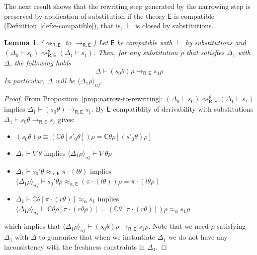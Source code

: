 \documentclass[submission,copyright,creativecommons]{eptcs}
\newcommand{\aleq}{\approx_{\alpha}}
\newcommand{\ealeq}{\approx_{\alpha,\theory{E}}}
\newcommand{\nfpair}[1]{\langle #1\rangle_{nf}}
\newcommand{\theory}[1]{\ensuremath{\mathsf{#1}}}
\newcommand{\context}[1]{\mathbb{C}}
\theoremstyle{plain}
\newtheorem{lemma}[theorem]{Lemma}
\theoremstyle{definition}
\theoremstyle{remark}
\begin{document}
The next result shows that the rewriting step generated by the narrowing step
is preserved by application of substitution if the theory \theory{E} is compatible (Definition~\ref{def:e-compatible}), that is, $\vdash$ is closed by substitutions.
\begin{lemma}{($\rightsquigarrow_{\theory{R,E}}$ to $\to_{\theory{R,E}}$)}
\label{lem:correctness}
Let \theory{E} be compatible with $\vdash$ by substitutions and  $(\Delta_0 \vdash s_0) \rightsquigarrow_{\theory{R,E}}^\theta (\Delta_1 \vdash s_1) $. Then, for any substitution $\rho$ that satisfies $\Delta_1$ with $\Delta$,
the following holds
$$\Delta \vdash (s_0 \theta )\rho \rightarrow_{\theory{R,E}}  s_1 \rho$$
In particular, $\Delta$ will be $\nfpair{\Delta_1\rho}$.
\end{lemma}
\begin{proof}
From Proposition~\ref{prop:narrow-to-rewriting}:
$(\Delta_0\vdash s_0) \rightsquigarrow_{\theory{R,E}}^{\theta} (\Delta_1 \vdash s_1) $ implies $\Delta_1\vdash (s_0 \theta ) \rightarrow_{\theory{R,E}}  s_1 $.
By \theory{E}-compatiblity of derivability with substitutions $\Delta_1 \vdash s_0\theta \rightarrow_{\theory{R,E}} s_1$ gives: 

\begin{itemize}
    \item $(s_0\theta)\rho \equiv (\context{C}\theta[s'_0\theta])\rho = \context{C}\theta\rho[(s'_0\theta)\rho]$
    \item $\Delta_1 \vdash \nabla\theta$ implies  $\nfpair{\Delta_1\rho} \vdash \nabla\theta\rho$
    \item $\Delta_1 \vdash s_0'\theta \ealeq \pi\cdot (l\theta)$ implies $\nfpair{\Delta_1\rho} \vdash s_0'\theta\rho \ealeq (\pi\cdot(l\theta))\rho = \pi\cdot(l\theta\rho)$
    \item $\Delta_1 \vdash \context{C}\theta[\pi\cdot(r\theta)] \aleq s_1$ implies $\nfpair{\Delta_1\rho} \vdash \context{C}\theta\rho[\pi\cdot(r\theta\rho)] = (\context{C}\theta[\pi\cdot(r\theta)])\rho \aleq s_1\rho$
\end{itemize}
which implies that $\nfpair{\Delta_1\rho} \vdash (s_0\theta)\rho \rightarrow_{\theory{R,E}} s_1\rho$.
Note that we need $\rho$ satisfying $\Delta_1$ with $\Delta$ to guarantee that when we instantiate $\Delta_1$ we do not have any inconsistency with the freshness constraints in $\Delta_1$.
\end{proof}
\end{document}
